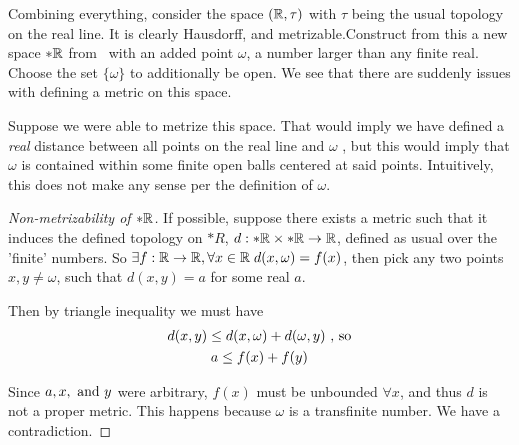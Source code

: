 \begin{frame}

    Combining everything, consider the space \((\mathbb{R}, \tau)\) with \(\tau\)
    being the usual topology on the real line. It is clearly Hausdorff, and
    metrizable.\pause Construct from this a new space \(*\mathbb{R}\) from \reals\,
    with an added point \(\omega\), a number larger than any finite real. Choose
    the set \(\{\omega\}\) to additionally be open. \pause We see that there are
    suddenly issues with defining a metric on this space.

\end{frame}

\begin{frame}

    Suppose we were able to metrize this space. That would imply we have defined
    a \emph{real} distance between all points on the real line and \(\omega\)
    \pause, but this would imply that \(\omega\) is contained within some finite
    open balls centered at said points. Intuitively, this does not make any
    sense per the definition of \(\omega\).

\end{frame}

\begin{frame}

    \begin{proof}[Non-metrizability of \(*\mathbb{R}\)]
        If possible, suppose there exists a metric such that it induces the
        defined topology on \(*R\), \(d:*\mathbb{R} \times *\mathbb{R} \to \mathbb{R}\),
        defined as usual over the 'finite' numbers. \pause So \(\exists f:\mathbb{R}
        \to \mathbb{R}, \forall x \in \mathbb{R} \;d(x, \omega) = f(x)\), then pick any
        two points \(x, y \not = \omega\), such that \(d(x, y) = a\) for some
        real \(a\). 
        
        \pause 
        Then by triangle inequality we must have
        \begin{gather*}
            d(x, y) \leq d(x, \omega) + d(\omega, y) \textnormal{ , so} \\
            a \leq f(x) + f(y)
        \end{gather*}

        Since \(a, x, \textnormal{ and } y\) were arbitrary, \(f(x)\) must be
        unbounded \(\forall x\), and thus \(d\) is not a proper metric. This
        happens because \(\omega\) is a transfinite number. We have a
        contradiction. 
    \end{proof}

\end{frame}